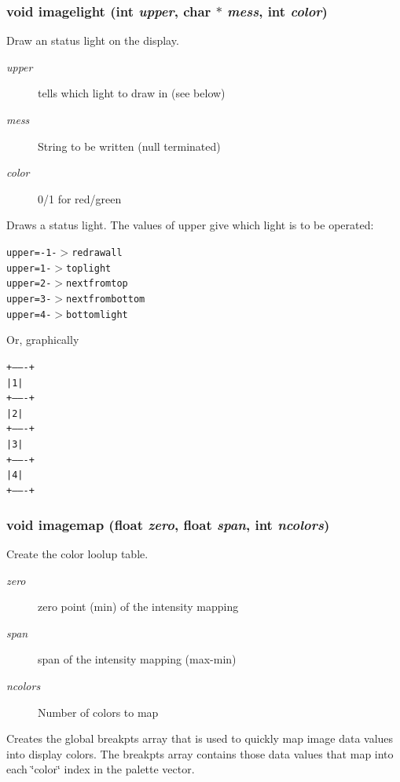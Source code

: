 \subsubsection{\setlength{\rightskip}{0pt plus 5cm}void imagelight (int {\em upper}, char $\ast$ {\em mess}, int {\em color})}\label{xtvutils_8c_a187}


Draw an status light on the display. 

\begin{Desc}
\item[Parameters:]
\begin{description}
\item[{\em upper}]tells which light to draw in (see below) \item[{\em mess}]String to be written (null terminated) \item[{\em color}]0/1 for red/green\end{description}
\end{Desc}
Draws a status light. The values of upper give which light is to be operated: \small\begin{alltt}
  upper = -1 -$>$ redraw all
  upper = 1  -$>$ top light
  upper = 2  -$>$ next from top
  upper = 3  -$>$ next from bottom
  upper = 4  -$>$ bottom light
  \end{alltt}\normalsize 
 Or, graphically \small\begin{alltt}
  +-------+
  |   1   |
  +-------+
  |   2   |
  +-------+
  |   3   |
  +-------+
  |   4   |
  +-------+
  \end{alltt}\normalsize 
\subsubsection{\setlength{\rightskip}{0pt plus 5cm}void imagemap (float {\em zero}, float {\em span}, int {\em ncolors})}\label{xtvutils_8c_a171}


Create the color loolup table. 

\begin{Desc}
\item[Parameters:]
\begin{description}
\item[{\em zero}]zero point (min) of the intensity mapping \item[{\em span}]span of the intensity mapping (max-min) \item[{\em ncolors}]Number of colors to map\end{description}
\end{Desc}
Creates the global breakpts array that is used to quickly map image data values into display colors. The breakpts array contains those data values that map into each \char`\"{}color\char`\"{} index in the palette vector.

